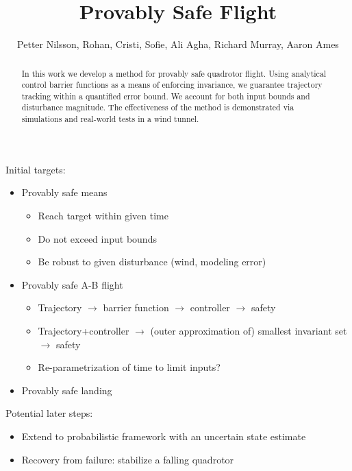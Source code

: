 \documentclass[conference]{IEEEtran}
\begin{document}
\title{\huge Provably Safe Flight }

\author{Petter Nilsson, Rohan, Cristi, Sofie, Ali Agha, Richard Murray, Aaron Ames}

\maketitle

\begin{abstract}
In this work we develop a method for provably safe quadrotor flight. Using analytical control barrier functions as a means of enforcing invariance, we guarantee trajectory tracking within a quantified error bound. We account for both input bounds and disturbance magnitude. The effectiveness of the method is demonstrated via simulations and real-world tests in a wind tunnel. 
\end{abstract}


\IEEEpeerreviewmaketitle

	

Initial targets:

\begin{itemize}
  \item Provably safe means
  \begin{itemize}
    \item Reach target within given time
    \item Do not exceed input bounds
    \item Be robust to given disturbance (wind, modeling error)
  \end{itemize}
  \item Provably safe A-B flight
  \begin{itemize}
    \item Trajectory $\rightarrow$ barrier function $\rightarrow$ controller $\rightarrow$ safety
    \item Trajectory+controller $\rightarrow$ (outer approximation of) smallest invariant set $\rightarrow$ safety
    \item Re-parametrization of time to limit inputs?
  \end{itemize}
  \item Provably safe landing
\end{itemize}

Potential later steps:
\begin{itemize}
  \item Extend to probabilistic framework with an uncertain state estimate
  \item Recovery from failure: stabilize a falling quadrotor
\end{itemize}
\end{document}
